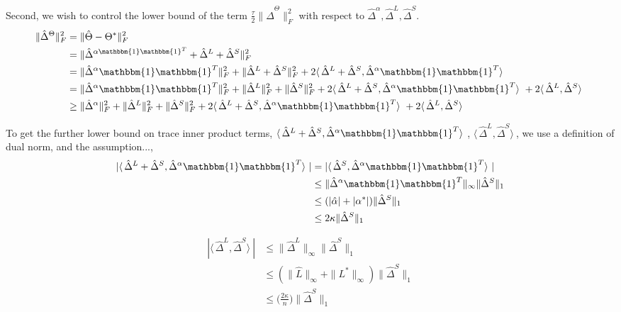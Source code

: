 \documentclass{article}
\begin{document}
Second, we wish to control the lower bound of the term  $\frac{\tau}{2}\|\hat{\Delta}^{\Theta}\|_{F}^{2}$ with respect to $\hat{\Delta}^{\alpha},\hat{\Delta}^{L},\hat{\Delta}^{S}$.
\begin{align}
\|\hat{\Delta}^{\Theta}\|_{F}^{2} 
&= \|\hat{\Theta}-\Theta^{*} \|_{F}^{2} \\
&= \|\hat\Delta^{\alpha\mathbbm{1}\mathbbm{1}^T} + \hat\Delta^{L} + \hat\Delta^{S}\|_{F}^{2} \\
&= \|\hat{\Delta}^{\alpha}\mathbbm{1}\mathbbm{1}^T\|_{F}^{2} + \|\hat{\Delta}^{L}+\hat{\Delta}^{S}\|_{F}^{2} + 
2 \langle\, \hat\Delta^{L} + \hat\Delta^{S} ,\hat{\Delta}^{\alpha}\mathbbm{1}\mathbbm{1}^T \rangle\ \\
&=  \|\hat{\Delta}^{\alpha}\mathbbm{1}\mathbbm{1}^T\|_{F}^{2} + \|\hat{\Delta}^{L}\|_{F}^{2} + \|\hat{\Delta}^{S}\|_{F}^{2} + 
2 \langle\, \hat\Delta^{L} + \hat\Delta^{S} ,\hat{\Delta}^{\alpha}\mathbbm{1}\mathbbm{1}^T \rangle\ +
2 \langle\, \hat\Delta^{L}, \hat\Delta^{S} \rangle\ \\
&\geq \|\hat{\Delta}^{\alpha}\|_{F}^{2} + \|\hat{\Delta}^{L}\|_{F}^{2} + \|\hat{\Delta}^{S}\|_{F}^{2} + 
2 \langle\, \hat\Delta^{L} + \hat\Delta^{S} ,\hat{\Delta}^{\alpha}\mathbbm{1}\mathbbm{1}^T \rangle\ +
2 \langle\, \hat\Delta^{L}, \hat\Delta^{S} \rangle\ 
\end{align}

To get the further lower bound on trace inner product terms, 
$ \langle\, \hat\Delta^{L} + \hat\Delta^{S} ,\hat{\Delta}^{\alpha}\mathbbm{1}\mathbbm{1}^T \rangle\ $, $ \langle\, \hat\Delta^{L}, \hat\Delta^{S} \rangle\ $, we use a definition of dual norm, and the assumption..., 
\begin{align}
    | \langle\, \hat\Delta^{L} + \hat\Delta^{S} ,\hat{\Delta}^{\alpha}\mathbbm{1}\mathbbm{1}^T\rangle\ |
    &= | \langle\,\hat\Delta^{S},\hat{\Delta}^{\alpha}\mathbbm{1}\mathbbm{1}^T\rangle\ | \\
    &\leq \|\hat{\Delta}^{\alpha}\mathbbm{1}\mathbbm{1}^T \|_{\infty} \|\hat{\Delta}^{S}\|_1 \\
    &\leq (|\hat{\alpha}|+|\alpha^{*}|)\|\hat{\Delta}^{S}\|_1\\
    &\leq 2\kappa\|\hat{\Delta}^{S}\|_1
\end{align}

\begin{align}
    | \langle\, \hat\Delta^{L}, \hat\Delta^{S} \rangle\ |
    &\leq \|\hat{\Delta}^{L}\|_{\infty} \|\hat{\Delta}^{S}\|_1\\
    &\leq (\|\hat{L}\|_{\infty} + \|L^{*}\|_{\infty})
    \|\hat{\Delta}^{S} \|_{1}\\
    &\leq \big(\frac{2\kappa}{n}\big)\|\hat{\Delta}^{S} \|_{1}
\end{align}
\end{document}
